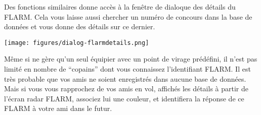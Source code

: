 Des fonctions similaires donne accès à la fenêtre de dialoque des détails du FLARM. Cela vous laisse aussi chercher un numéro de concours dans la base de données et vous donne des détails sur ce dernier. 

\begin{center}
\texttt{[image: figures/dialog-flarmdetails.png]}
\end{center}

Même si \xc{} ne gère qu'un seul équipier avec un point de virage prédéfini, il n'est pas limité en nombre de ``copains'' dont vous connaissez l'identifiant FLARM. Il est très probable que vos amis ne soient enregistrés dans aucune base de données. Mais si vous vous rapprochez de vos amis en vol, affichés les détails à partir de l'écran radar FLARM, associez lui une couleur, et \xc{} identifiera la réponse de ce FLARM à votre ami dans le futur.
